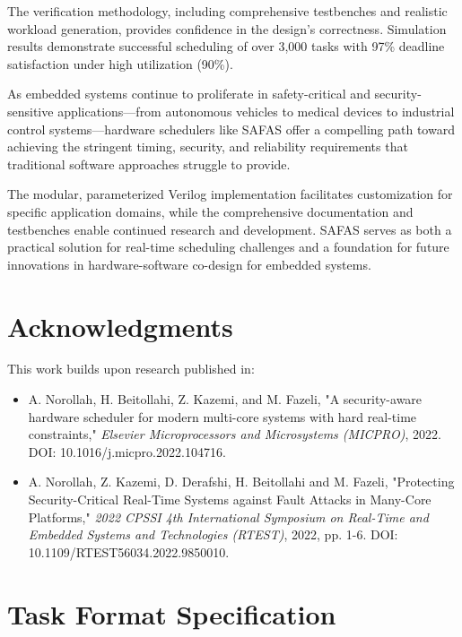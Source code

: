 \documentclass[12pt,a4paper]{article}
\begin{document}
The verification methodology, including comprehensive testbenches and realistic workload generation, provides confidence in the design's correctness. Simulation results demonstrate successful scheduling of over 3,000 tasks with 97\% deadline satisfaction under high utilization (90\%).

As embedded systems continue to proliferate in safety-critical and security-sensitive applications—from autonomous vehicles to medical devices to industrial control systems—hardware schedulers like SAFAS offer a compelling path toward achieving the stringent timing, security, and reliability requirements that traditional software approaches struggle to provide.

The modular, parameterized Verilog implementation facilitates customization for specific application domains, while the comprehensive documentation and testbenches enable continued research and development. SAFAS serves as both a practical solution for real-time scheduling challenges and a foundation for future innovations in hardware-software co-design for embedded systems.

\section*{Acknowledgments}

This work builds upon research published in:

\begin{itemize}
    \item A. Norollah, H. Beitollahi, Z. Kazemi, and M. Fazeli, "A security-aware hardware scheduler for modern multi-core systems with hard real-time constraints," \textit{Elsevier Microprocessors and Microsystems (MICPRO)}, 2022. DOI: 10.1016/j.micpro.2022.104716.

    \item A. Norollah, Z. Kazemi, D. Derafshi, H. Beitollahi and M. Fazeli, "Protecting Security-Critical Real-Time Systems against Fault Attacks in Many-Core Platforms," \textit{2022 CPSSI 4th International Symposium on Real-Time and Embedded Systems and Technologies (RTEST)}, 2022, pp. 1-6. DOI: 10.1109/RTEST56034.2022.9850010.
\end{itemize}

\appendix

\section{Task Format Specification}
\end{document}
